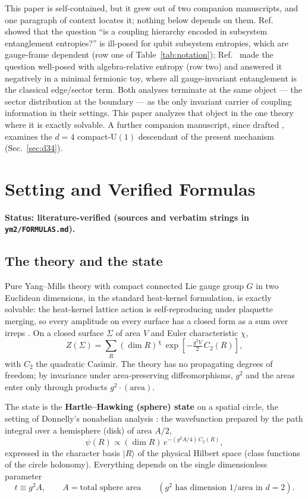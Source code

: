\documentclass[11pt]{article}
\theoremstyle{remark}
\theoremstyle{plain}
\begin{document}
This paper is self-contained, but it grew out of two companion manuscripts, and one paragraph of context locates it; nothing below depends on them. Ref.~\cite{P1} showed that the question ``is a coupling hierarchy encoded in subsystem entanglement entropies?'' is ill-posed for qubit subsystem entropies, which are gauge-frame dependent (row one of Table~\ref{tab:notation}); Ref.~\cite{P2} made the question well-posed with algebra-relative entropy (row two) and answered it negatively in a minimal fermionic toy, where all gauge-invariant entanglement is the classical edge/sector term. Both analyses terminate at the same object --- the sector distribution at the boundary --- as the only invariant carrier of coupling information in their settings. This paper analyzes that object in the one theory where it is exactly solvable. A further companion manuscript, since drafted \cite{u1fourd}, examines the $d = 4$ compact-$\mathrm{U}(1)$ descendant of the present mechanism (Sec.~\ref{sec:d34}).

\section{Setting and Verified Formulas}\label{sec:setting}

\textbf{Status: literature-verified (sources and verbatim strings in \texttt{ym2/FORMULAS.md}).}

\subsection{The theory and the state}

Pure Yang--Mills theory with compact connected Lie gauge group $G$ in two Euclidean dimensions, in the standard heat-kernel formulation, is exactly solvable: the heat-kernel lattice action is self-reproducing under plaquette merging, so every amplitude on every surface has a closed form as a sum over irreps \cite{Mig75, Rus90, Wit91, CMR94}. On a closed surface $\Sigma$ of area $V$ and Euler characteristic $\chi$,
\[
Z(\Sigma) = \sum_R (\dim R)^{\chi}\, \exp\!\left[-\tfrac{g^2 V}{2}\, C_2(R)\right],
\]
with $C_2$ the quadratic Casimir. The theory has no propagating degrees of freedom; by invariance under area-preserving diffeomorphisms, $g^2$ and the areas enter only through products $g^2 \cdot (\text{area})$.

The state is the \textbf{Hartle--Hawking (sphere) state} on a spatial circle, the setting of Donnelly's nonabelian analysis \cite{D14}: the wavefunction prepared by the path integral over a hemisphere (disk) of area $A/2$,
\[
\psi(R) \propto (\dim R)\, e^{-(g^2 A/4)\, C_2(R)},
\]
expressed in the character basis $|R\rangle$ of the physical Hilbert space (class functions of the circle holonomy). Everything depends on the single dimensionless parameter
\[
t \equiv g^2 A, \qquad A = \text{total sphere area} \qquad (g^2 \text{ has dimension } 1/\text{area in } d = 2).
\]
\end{document}
